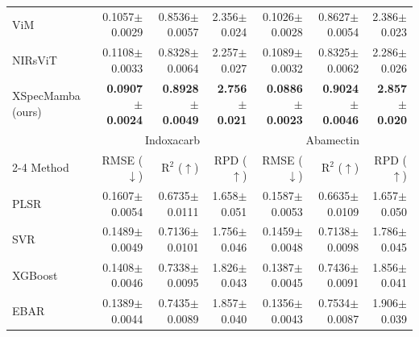 \documentclass[pdflatex,sn-mathphys-num]{sn-jnl}%
\begin{document}
\begin{table}
\begin{tabular*}{\textheight}{@{\extracolsep\fill}lrrrrrr}
ViM \cite{zhu2024vision} &
0.1057{\scriptsize$\pm$0.0029} & 0.8536{\scriptsize$\pm$0.0057} & 2.356{\scriptsize$\pm$0.024} &
0.1026{\scriptsize$\pm$0.0028} & 0.8627{\scriptsize$\pm$0.0054} & 2.386{\scriptsize$\pm$0.023} \\

NIRsViT \cite{van2024nirsvit} &
0.1108{\scriptsize$\pm$0.0033} & 0.8328{\scriptsize$\pm$0.0064} & 2.257{\scriptsize$\pm$0.027} &
0.1089{\scriptsize$\pm$0.0032} & 0.8325{\scriptsize$\pm$0.0062} & 2.286{\scriptsize$\pm$0.026} \\

\midrule

XSpecMamba (ours) &
\textbf{0.0907{\scriptsize$\pm$0.0024}} &
\textbf{0.8928{\scriptsize$\pm$0.0049}} &
\textbf{2.756{\scriptsize$\pm$0.021}} &
\textbf{0.0886{\scriptsize$\pm$0.0023}} &
\textbf{0.9024{\scriptsize$\pm$0.0046}} &
\textbf{2.857{\scriptsize$\pm$0.020}} \\

\midrule

& \multicolumn{3}{c}{Indoxacarb} & \multicolumn{3}{c}{Abamectin} \\
\cmidrule{2-4}\cmidrule{5-7}
Method &
RMSE ($\downarrow$) & $\text{R}^2$ ($\uparrow$) & RPD ($\uparrow$) &
RMSE ($\downarrow$) & $\text{R}^2$ ($\uparrow$) & RPD ($\uparrow$) \\
\midrule

PLSR &
0.1607{\scriptsize$\pm$0.0054} & 0.6735{\scriptsize$\pm$0.0111} & 1.658{\scriptsize$\pm$0.051} &
0.1587{\scriptsize$\pm$0.0053} & 0.6635{\scriptsize$\pm$0.0109} & 1.657{\scriptsize$\pm$0.050} \\

SVR &
0.1489{\scriptsize$\pm$0.0049} & 0.7136{\scriptsize$\pm$0.0101} & 1.756{\scriptsize$\pm$0.046} &
0.1459{\scriptsize$\pm$0.0048} & 0.7138{\scriptsize$\pm$0.0098} & 1.786{\scriptsize$\pm$0.045} \\

XGBoost &
0.1408{\scriptsize$\pm$0.0046} & 0.7338{\scriptsize$\pm$0.0095} & 1.826{\scriptsize$\pm$0.043} &
0.1387{\scriptsize$\pm$0.0045} & 0.7436{\scriptsize$\pm$0.0091} & 1.856{\scriptsize$\pm$0.041} \\

EBAR \cite{phan2025ebar} &
0.1389{\scriptsize$\pm$0.0044} & 0.7435{\scriptsize$\pm$0.0089} & 1.857{\scriptsize$\pm$0.040} &
0.1356{\scriptsize$\pm$0.0043} & 0.7534{\scriptsize$\pm$0.0087} & 1.906{\scriptsize$\pm$0.039} \\

\midrule


\end{tabular*}
\end{table}
\end{document}
